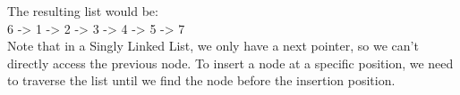 \documentclass[preview]{standalone}
\begin{document}
The resulting list would be:\\6 -> 1 -> 2 -> 3 -> 4 -> 5 -> 7\\Note that in a Singly Linked List, we only have a next pointer, so we can't directly access the previous node. To insert a node at a specific position, we need to traverse the list until we find the node before the insertion position.\\
\end{document}
